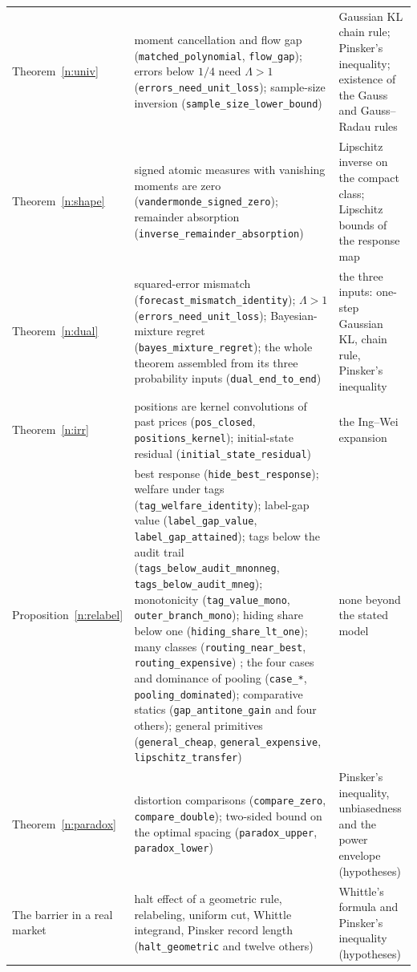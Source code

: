 \documentclass[12pt]{article}
\theoremstyle{definition}
\theoremstyle{remark}
\begin{document}
{\begin{longtable}{>{\raggedright\arraybackslash}p{}>{\raggedright\arraybackslash}p{}>{\raggedright\arraybackslash}p{}}
Theorem~\ref{n:univ} & moment cancellation and flow gap (\texttt{matched\_polynomial}, \texttt{flow\_gap}); errors below $1/4$ need $\Lambda>1$ (\texttt{errors\_need\_unit\_loss}); sample-size inversion (\texttt{sample\_size\_lower\_bound}) & Gaussian KL chain rule; Pinsker's inequality; existence of the Gauss and Gauss--Radau rules\\
Theorem~\ref{n:shape} & signed atomic measures with vanishing moments are zero (\texttt{vandermonde\_signed\_zero}); remainder absorption (\texttt{inverse\_remainder\_absorption}) & Lipschitz inverse on the compact class; Lipschitz bounds of the response map\\
Theorem~\ref{n:dual} & squared-error mismatch (\texttt{forecast\_mismatch\_identity}); $\Lambda>1$ (\texttt{errors\_need\_unit\_loss}); Bayesian-mixture regret (\texttt{bayes\_mixture\_regret}); the whole theorem assembled from its three probability inputs (\texttt{dual\_end\_to\_end}) & the three inputs: one-step Gaussian KL, chain rule, Pinsker's inequality\\
Theorem~\ref{n:irr} & positions are kernel convolutions of past prices (\texttt{pos\_closed}, \texttt{positions\_kernel}); initial-state residual (\texttt{initial\_state\_residual}) & the Ing--Wei expansion\\
Proposition~\ref{n:relabel} & best response (\texttt{hide\_best\_response}); welfare under tags (\texttt{tag\_welfare\_identity}); label-gap value (\texttt{label\_gap\_value}, \texttt{label\_gap\_attained}); tags below the audit trail (\texttt{tags\_below\_audit\_mnonneg}, \texttt{tags\_below\_audit\_mneg}); monotonicity (\texttt{tag\_value\_mono}, \texttt{outer\_branch\_mono}); hiding share below one (\texttt{hiding\_share\_lt\_one}); many classes (\texttt{routing\_near\_best}, \texttt{routing\_expensive}) ; the four cases and dominance of pooling (\texttt{case\_*}, \texttt{pooling\_dominated}); comparative statics (\texttt{gap\_antitone\_gain} and four others); general primitives (\texttt{general\_cheap}, \texttt{general\_expensive}, \texttt{lipschitz\_transfer}) & none beyond the stated model\\
Theorem~\ref{n:paradox} & distortion comparisons (\texttt{compare\_zero}, \texttt{compare\_double}); two-sided bound on the optimal spacing (\texttt{paradox\_upper}, \texttt{paradox\_lower}) & Pinsker's inequality, unbiasedness and the power envelope (hypotheses)\\
The barrier in a real market & halt effect of a geometric rule, relabeling, uniform cut, Whittle integrand, Pinsker record length (\texttt{halt\_geometric} and twelve others) & Whittle's formula and Pinsker's inequality (hypotheses)\\

\end{longtable}}
\end{document}

